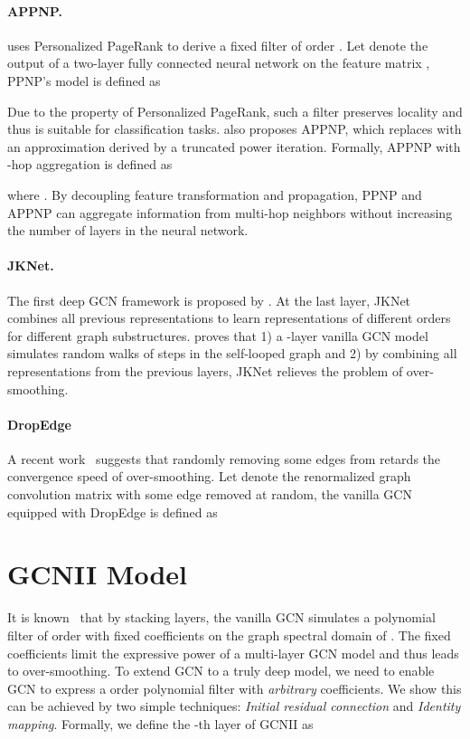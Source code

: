\documentclass{article}
\begin{document}
\paragraph{APPNP.}
\cite{klicpera_predict_2019} uses Personalized PageRank to derive a fixed filter of order . Let  denote the output of a two-layer fully connected neural network on the feature matrix , PPNP's model is defined as

  Due to the property of Personalized PageRank, such a filter preserves locality and thus is suitable for classification tasks. 
  \cite{klicpera_predict_2019}  also proposes APPNP, which replaces  with an approximation derived by a truncated power iteration. Formally, APPNP with -hop aggregation is defined as
  
where .
  By decoupling feature transformation and propagation, PPNP and APPNP can aggregate information from multi-hop neighbors without increasing the number of layers in the neural network. 

\paragraph{JKNet.}
The first  deep GCN framework is proposed by \cite{DBLP:conf/icml/XuLTSKJ18}.  At the last layer, JKNet combines all previous representations  to learn representations of different orders for different graph substructures. 
\cite{DBLP:conf/icml/XuLTSKJ18}  proves that 1) a -layer vanilla GCN model simulates random walks of  steps in the self-looped graph  and 2) by combining all representations from the previous layers, JKNet relieves the problem of over-smoothing. 

\paragraph{DropEdge}
A recent work~\cite{rong2020dropedge} suggests that randomly removing some edges from  retards the convergence speed of over-smoothing. Let  denote the renormalized graph convolution matrix with some edge removed at random, the vanilla GCN equipped with DropEdge is defined as


 \section{GCNII  Model}
\label{sec:model}
It is known~\cite{pmlr-v97-wu19e}  that by stacking  layers, the
vanilla GCN simulates a polynomial filter  of order  with fixed
coefficients  on the graph spectral
domain of . The fixed coefficients limit the expressive
power of a multi-layer GCN model and thus leads to over-smoothing.
To extend GCN to a truly deep model, we need to
enable GCN to  express a  order polynomial
filter with {\em arbitrary} coefficients. We show this can be achieved
by two simple
techniques: {\em Initial residual connection} and  {\em Identity
  mapping}.  Formally, we define the -th layer of GCNII  as 
    
\end{document}
